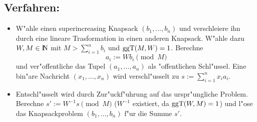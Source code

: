      \subsection*{Verfahren:}
     \begin{itemize}
        \item W"ahle einen superincreasing Knapsack $(b_1,\ldots ,b_n)$ und 
          verschleiere ihn durch eine lineare Trasformation in einen anderen 
          Knapsack. W"ahle dazu $W,M\in \N$ mit $M > \sum_{i=1}^n b_i$ und 
          $\mbox{ggT}(M,W)=1$. Berechne 
          \begin{equation} a_i := W b_i \pmod M \label{verschleiern} \end{equation}
          und ver"offentliche das Tupel $(a_1,\ldots,a_n)$ als "offentlichen 
          Schl"ussel. Eine bin"are Nachricht $(x_1,\ldots ,x_n)$ wird verschl"usselt zu 
          $s:=\sum_{i=1}^n x_i a_i$.
        \item Entschl"usselt wird durch Zur"uckf"uhrung auf das urspr"ungliche 
          Problem. Berechne $s' := W^{-1} s \pmod M$ 
          ($W^{-1}$ existiert, da $\mbox{ggT}(W,M)=1$) und l"ose das 
          Knapsackproblem $(b_1,\ldots,b_n)$ f"ur die Summe $s'$.
     \end{itemize}   
